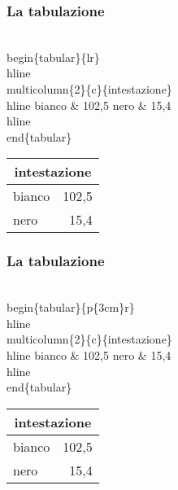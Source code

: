 \begin{frame}
  \frametitle{La tabulazione}
	\begin{LaTeXcode}
		\\begin\{tabular\}\{lr\}\
		\\hline \n
		\alert{\\multicolumn\{2\}\{c\}\{intestazione\}\bs\bs} \
		\\hline \n
		\hspace*{5ex}bianco \& 102,5 \bs\bs\n
		\hspace*{5ex}nero   \& 15,4 \bs\bs\
		\\hline\n
		\\end\{tabular\}
	\end{LaTeXcode}
	\begin{LaTeXoutput}
		\begin{tabular}{lr}\hline
		\multicolumn{2}{c}{intestazione}\\\hline
		bianco & 102,5 \\
		nero   & 15,4 \\\hline
		\end{tabular}
	\end{LaTeXoutput}
\end{frame}
\begin{frame}
  \frametitle{La tabulazione}
	\begin{LaTeXcode}
		\\begin\{tabular\}\{\alert{p\{3cm\}}r\}\
		\\hline \n
		\\multicolumn\{2\}\{c\}\{intestazione\}\bs\bs \
		\\hline \n
		\hspace*{5ex}bianco \& 102,5 \bs\bs\n
		\hspace*{5ex}nero   \& 15,4 \bs\bs\
		\\hline\n
		\\end\{tabular\}
	\end{LaTeXcode}
	\begin{LaTeXoutput}
		\begin{tabular}{p{3cm}r}\hline
		\multicolumn{2}{c}{intestazione}\\\hline
		bianco & 102,5 \\
		nero   & 15,4 \\\hline
		\end{tabular}
	\end{LaTeXoutput}
\end{frame}
